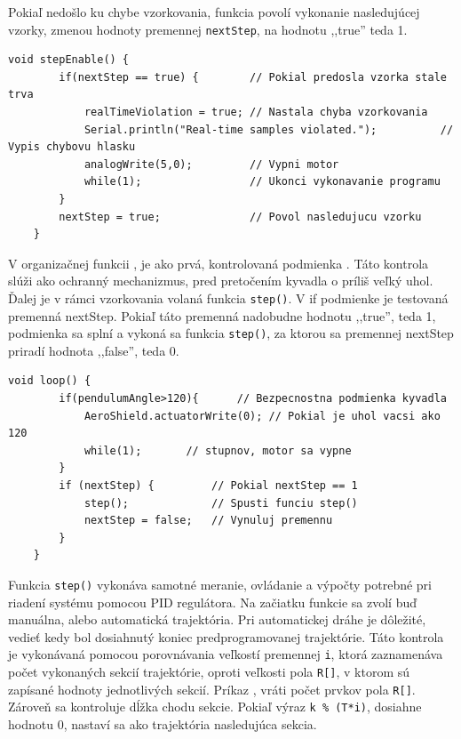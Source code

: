 Pokiaľ nedošlo ku chybe vzorkovania, funkcia povolí vykonanie nasledujúcej vzorky, zmenou hodnoty premennej \verb|nextStep|, na hodnotu ,,true'' teda 1. 

\begin{lstlisting}[caption={Funkcia stepEnable().},captionpos=b]
	void stepEnable() {                          
		if(nextStep == true) {        // Pokial predosla vzorka stale trva
			realTimeViolation = true; // Nastala chyba vzorkovania
			Serial.println("Real-time samples violated."); 			// Vypis chybovu hlasku
			analogWrite(5,0);         // Vypni motor 
			while(1);                 // Ukonci vykonavanie programu
		}
		nextStep = true;              // Povol nasledujucu vzorku
	}
\end{lstlisting}

V organizačnej funkcii , je ako prvá, kontrolovaná podmienka . Táto kontrola slúži ako ochranný mechanizmus, pred pretočením kyvadla o príliš veľký uhol. Ďalej je v rámci vzorkovania volaná funkcia \verb|step()|. V if podmienke je testovaná premenná nextStep. Pokiaľ táto premenná nadobudne hodnotu ,,true'', teda 1, podmienka sa splní a vykoná sa funkcia \verb|step()|, za ktorou sa premennej nextStep priradí hodnota ,,false'', teda 0.

\begin{lstlisting}[caption={Organzačná funkcia loop.},captionpos=b]
	void loop() {
		if(pendulumAngle>120){		// Bezpecnostna podmienka kyvadla 
			AeroShield.actuatorWrite(0); // Pokial je uhol vacsi ako 120
			while(1);		// stupnov, motor sa vypne
		} 
		if (nextStep) {         // Pokial nextStep == 1
			step();             // Spusti funciu step()
			nextStep = false;   // Vynuluj premennu 
		}
	}
\end{lstlisting}

Funkcia \verb|step()| vykonáva samotné meranie, ovládanie a výpočty potrebné pri riadení systému pomocou PID regulátora. Na začiatku funkcie sa zvolí buď manuálna, alebo automatická trajektória. Pri automatickej dráhe je dôležité, vedieť kedy bol dosiahnutý koniec predprogramovanej trajektórie. Táto kontrola je vykonávaná pomocou porovnávania veľkostí premennej \verb|i|, ktorá zaznamenáva počet vykonaných sekcií trajektórie, oproti veľkosti pola \verb|R[]|, v ktorom sú zapísané hodnoty jednotlivých sekcií. Príkaz , vráti počet prvkov pola \verb|R[]|. Zároveň sa kontroluje dĺžka chodu sekcie. Pokiaľ výraz \verb|k % (T*i)|, dosiahne hodnotu 0, nastaví sa ako trajektória nasledujúca sekcia. 

